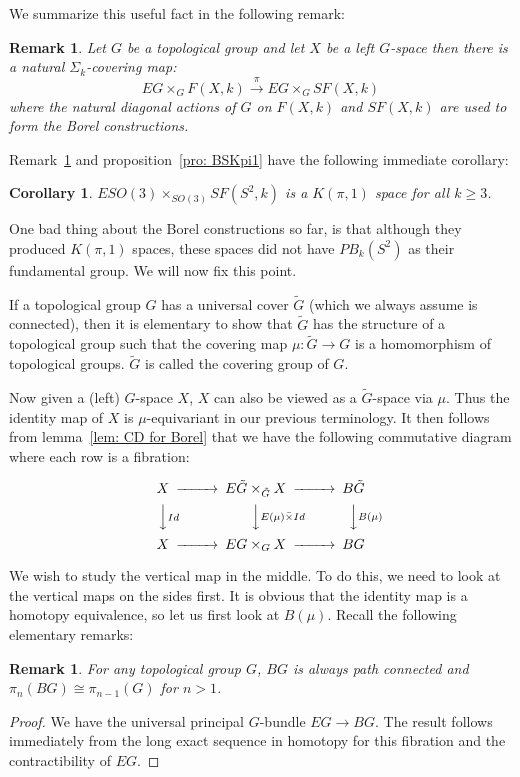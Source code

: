 \documentclass{amsart}
\newtheorem{cor}[thm]{Corollary}
\newtheorem{rem}[thm]{Remark}
\begin{document}
We summarize this useful fact in the following remark:

\begin{rem}
\label{rem: Borelcover}
Let $G$ be a topological group and let $X$ be a left $G$-space
then there is a natural $\Sigma_k$-covering map:
$$
EG \times_G F(X,k) \overset{\pi}{\rightarrow} EG \times_G SF(X,k)
$$
where the natural diagonal actions of $G$ on $F(X,k)$ and $SF(X,k)$
are used to form the Borel constructions. 
\end{rem}

Remark~\ref{rem: Borelcover} and proposition~\ref{pro: BSKpi1}
have the following immediate corollary:

\begin{cor}
\label{cor: BSKpi1}
$ESO(3) \times_{SO(3)} SF(S^2,k)$ is a $K(\pi,1)$ space for all $k \geq 3$.
\end{cor} 

One bad thing about the Borel constructions so far, is that although
they produced $K(\pi,1)$ spaces, these spaces did not have $PB_k(S^2)$
as their fundamental group.
We will now fix this point.

If a topological group $G$ has a universal cover $\tilde{G}$ (which
we always assume is connected), then it is elementary to show that
$\tilde{G}$ has the structure of a topological group such that
the covering map $\mu: \tilde{G} \rightarrow G$ is a homomorphism
of topological groups. $\tilde{G}$ is called the covering group
of $G$.

Now given a (left) $G$-space $X$, $X$ can also be viewed as a
$\tilde{G}$-space via $\mu$. Thus the identity map of $X$ is
$\mu$-equivariant in our previous terminology.
It then follows from lemma~\ref{lem: CD for Borel} that we have
the following commutative diagram where each row is a fibration:

$$
\begin{CD}
X @>>> E\tilde{G} \times_{\tilde{G}} X @>>> B\tilde{G} \\
@VV Id V @VV E(\mu) \bar{\times} Id V @VV B(\mu) V \\
X @>>> EG \times_G X @>>> BG 
\end{CD}
$$

We wish to study the vertical map in the middle.
To do this, we need to look at the vertical maps on the sides
first. It is obvious that the identity map is a homotopy equivalence,
 so let
us first look at $B(\mu)$. Recall the following elementary remarks:

\begin{rem}
For any topological group $G$, $BG$ is always path connected and
$\pi_n(BG) \cong \pi_{n-1}(G)$ for $n>1$.
\end{rem}
\begin{proof}
We have the universal principal $G$-bundle $EG \rightarrow BG$.
The result follows immediately from the long exact sequence
in homotopy for this fibration and the contractibility of $EG$.
\end{proof} 
\end{document}
